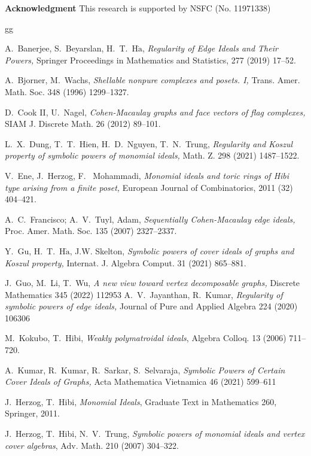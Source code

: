 \documentclass[12pt]{amsart}
\begin{document}
{\bf \noindent Acknowledgment}
This research is supported by NSFC (No. 11971338)


\begin{thebibliography}{gg}


  A.~Banerjee, S.~Beyarslan, H.~T.~H$\mathrm{\grave{a}}$, \textit{ Regularity of Edge Ideals and Their Powers,} Springer Proceedings in Mathematics and Statistics, 277 (2019)  17--52.

  A.~Bjorner, M.~Wachs,  \textit{Shellable nonpure complexes and posets. I,} Trans.
Amer. Math. Soc. 348 (1996) 1299--1327.


 D.~Cook II, U.~Nagel,
\textit{Cohen-Macaulay graphs and face vectors of flag complexes,}
SIAM J. Discrete Math. 26 (2012) 89--101.


 L.~X.~Dung, T.~T.~Hien, H.~D.~Nguyen, T.~N.~Trung, \textit{Regularity and Koszul property of symbolic
powers of monomial ideals,} Math. Z. 298 (2021) 1487--1522.


 V.~Ene, J.~Herzog,  F.~ Mohammadi, \textit{Monomial ideals and toric rings of Hibi type arising from a
finite poset,}  European Journal of Combinatorics,  2011 (32)  404--421.


 A.~C.~Francisco;  A.~V.~Tuyl, Adam, \textit{Sequentially Cohen-Macaulay edge ideals,}  Proc. Amer. Math. Soc. 135 (2007) 2327--2337.




 Y.~Gu, H.~T.~H$\mathrm{\grave{a}}$,  J.W. Skelton,  \textit{Symbolic powers of cover ideals of graphs and Koszul property, } Internat. J. Algebra Comput. 31 (2021)  865--881.

 J.~Guo, M.~Li, T.~Wu,   \textit{A new view toward vertex decomposable graphs,}  Discrete Mathematics 345 (2022) 112953
  A.~V.~Jayanthan, R.~Kumar, \textit{Regularity of symbolic powers of edge ideals,} Journal of Pure and Applied Algebra 224 (2020) 106306

  M.~Kokubo, T.~Hibi, \textit{Weakly polymatroidal ideals},     Algebra Colloq. 13 (2006) 711--720.

 A.~Kumar, R.~Kumar,  R.~Sarkar,  S.~Selvaraja, \textit{Symbolic Powers of Certain Cover Ideals of Graphs,} Acta Mathematica Vietnamica 46   (2021) 599--611

J.~Herzog,  T.~Hibi, \textit{Monomial Ideals}, Graduate Text in Mathematics  260, Springer,  2011.

  J.~Herzog, T.~Hibi, N.~V.~Trung, \textit{Symbolic powers of monomial ideals
and vertex cover algebras}, Adv. Math.  210 (2007)  304--322.



\end{thebibliography}
\end{document}
